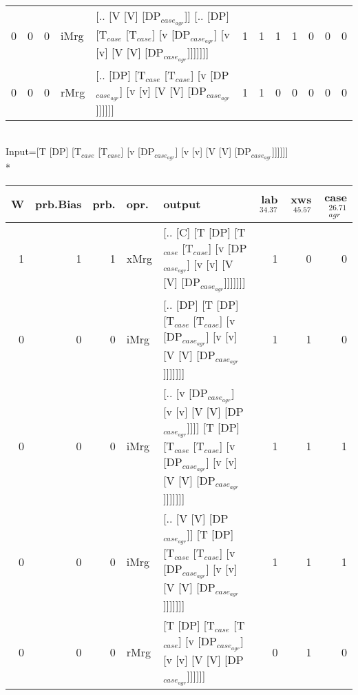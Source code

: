 \begin{tabularx}{\linewidth}{rrrlXrrrrrrr}
   0 &       0 &   0 & iMrg & [.. [V [V] [DP$_{case_{agr}}$]] [.. [DP] [T$_{case}$ [T$_{case}$] [v [DP$_{case_{agr}}$] [v [v] [V [V] [DP$_{case_{agr}}$]]]]]]]                                             &             1 &             1 &                  1 &            1 &              0 &                0 &              0 \\
   0 &       0 &   0 & rMrg & [.. [DP] [T$_{case}$ [T$_{case}$] [v [DP$_{case_{agr}}$] [v [v] [V [V] [DP$_{case_{agr}}$]]]]]]                                                                        &             1 &             1 &                  0 &            0 &              0 &                0 &              0 \\
\hline
\end{tabularx}\endgroup\\
\begingroup\scriptsize Input=[T [DP] [T$_{case}$ [T$_{case}$] [v [DP$_{case_{agr}}$] [v [v] [V [V] [DP$_{case_{agr}}$]]]]]]\\*
\begin{tabularx}{\linewidth}{rrrlXrrr}
\hline
   W &   prb.Bias &   prb. & opr.   & output                                                                                                                          &   lab$^{34.37}$ &   xws$^{45.57}$ &   case$_{agr}^{26.71}$ \\
\hline
   1 &       1 &   1 & xMrg & [.. [C] [T [DP] [T$_{case}$ [T$_{case}$] [v [DP$_{case_{agr}}$] [v [v] [V [V] [DP$_{case_{agr}}$]]]]]]]                                             &             1 &             0 &                  0 \\
   0 &       0 &   0 & iMrg & [.. [DP] [T [DP] [T$_{case}$ [T$_{case}$] [v [DP$_{case_{agr}}$] [v [v] [V [V] [DP$_{case_{agr}}$]]]]]]]                                            &             1 &             1 &                  0 \\
   0 &       0 &   0 & iMrg & [.. [v [DP$_{case_{agr}}$] [v [v] [V [V] [DP$_{case_{agr}}$]]]] [T [DP] [T$_{case}$ [T$_{case}$] [v [DP$_{case_{agr}}$] [v [v] [V [V] [DP$_{case_{agr}}$]]]]]]] &             1 &             1 &                  1 \\
   0 &       0 &   0 & iMrg & [.. [V [V] [DP$_{case_{agr}}$]] [T [DP] [T$_{case}$ [T$_{case}$] [v [DP$_{case_{agr}}$] [v [v] [V [V] [DP$_{case_{agr}}$]]]]]]]                           &             1 &             1 &                  1 \\
   0 &       0 &   0 & rMrg & [T [DP] [T$_{case}$ [T$_{case}$] [v [DP$_{case_{agr}}$] [v [v] [V [V] [DP$_{case_{agr}}$]]]]]]                                                      &             0 &             1 &                  0 \\
\hline
\end{tabularx}\endgroup\\
